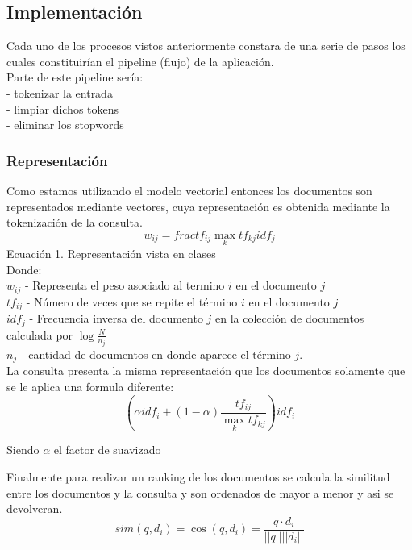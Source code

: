 \documentclass[runningheads]{llncs}
\begin{document}
\subsection*{Implementación}
Cada uno de los procesos vistos anteriormente constara de una serie de pasos los cuales constituirían el pipeline (flujo) de la aplicación.\\

Parte de este pipeline sería: \\
- tokenizar la entrada \\
- limpiar dichos tokens \\
- eliminar los stopwords

\subsubsection*{Representación}
Como estamos utilizando el modelo vectorial entonces los documentos son representados mediante vectores, cuya representación es obtenida mediante la tokenización de la consulta.
\begin{equation}
	w_{ij} = frac{tf_{ij}}{\max_{k} tf_{kj}}idf_{j}
\end{equation}
Ecuación 1. Representación vista en clases\\

Donde:\\
$ w_{ij} $ - Representa el peso asociado al termino $ i $ en el documento $ j $\\
$tf_{ij}$ - Número de veces que se repite el término $i$ en el documento $j$\\
$idf_{j}$ - Frecuencia inversa del documento $j$ en la colección de documentos calculada por $\log{\frac{N}{n_j}}$\\
$n_j$ - cantidad de documentos en donde aparece el término $j$.\\

La consulta presenta la misma representación que los documentos solamente que se le aplica una formula diferente:
\begin{equation}
	(\alpha idf_i + (1-\alpha)\frac{tf_{ij}}{\max_{k} tf_{kj}}) idf_i
\end{equation}

Siendo $\alpha$ el factor de suavizado

Finalmente para realizar un ranking de los documentos se calcula la similitud entre los documentos y la consulta y son ordenados de mayor a menor y asi se devolveran.
\begin{equation}
	sim(q,d_i) = \cos(q, d_i) = \frac{q \cdot d_i}{||q|| ||d_i||}
\end{equation}
\end{document}
